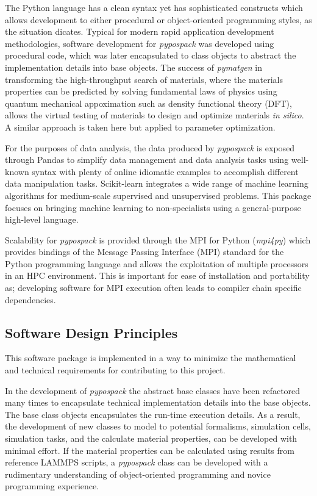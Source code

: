 The Python language has a clean syntax yet has sophisticated constructs which allows development to either procedural or object-oriented programming styles, as the situation dicates.  Typical for modern  rapid application development methodologies, software development for \emph{pypospack} was developed using procedural code, which was later encapsulated to class objects to abstract the implementation details into base objects.  The success of \emph{pymatgen} in transforming the high-throughput search of materials,  where the materials properties can be predicted by solving fundamental laws of physics using quantum mechanical appoximation such as density functional theory (DFT), allows the virtual testing of materials to design and optimize materials \emph{in silico}.  A similar approach is taken here but applied to parameter optimization.

For the purposes of data analysis, the data produced by \emph{pypospack} is exposed through Pandas\cite{mckinney2010_pandas} to simplify data management and data analysis tasks using well-known syntax with plenty of online idiomatic examples to accomplish different data manipulation tasks.
Scikit-learn\cite{pedregosa2011_sklearn} integrates a wide range of machine learning algorithms for medium-scale supervised and unsupervised problems. This package focuses on bringing machine learning to non-specialists using a general-purpose high-level language.

Scalability for \emph{pypospack} is provided through the MPI for Python (\emph{mpi4py})\cite{dalcin2005_mpi4py,dalcin2008_mpi4py} which provides bindings of the Message Passing Interface (MPI)\cite{mpi2015} standard for the Python programming language and allows the exploitation of multiple processors in an HPC environment.  This is important for ease of installation and portability as; developing software for MPI execution often leads to compiler chain specific dependencies.

\subsection{Software Design Principles}

This software package is implemented in a way to minimize the mathematical and technical requirements for contributing to this project.

In the development of \emph{pypospack} the abstract base classes have been refactored many times to encapsulate technical implementation details into the base objects.  The base class objects encapsulates the run-time execution details.  As a result, the development of new classes to model to potential formalisms, simulation cells, simulation tasks, and the calculate material properties, can be developed with minimal effort.  If the material properties can be calculated using results from reference LAMMPS scripts, a \emph{pypospack} class can be developed with a rudimentary understanding of object-oriented programming and novice programming experience.

